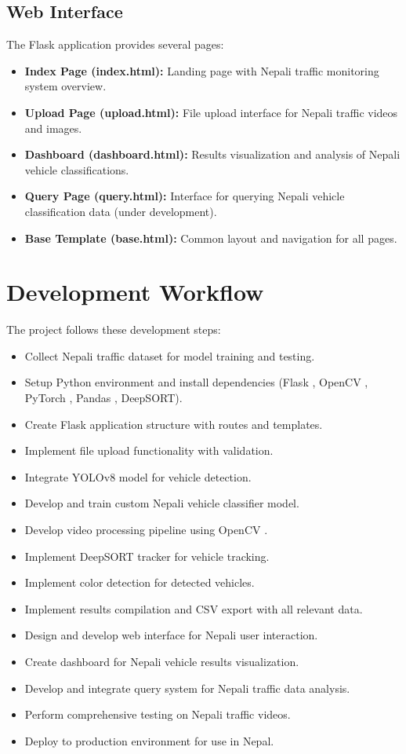 \documentclass[12pt,a4paper]{report}
\begin{document}
\subsection{Web Interface}
The Flask application provides several pages:
\begin{itemize}
    \item \textbf{Index Page (index.html):} Landing page with Nepali traffic monitoring system overview.
    \item \textbf{Upload Page (upload.html):} File upload interface for Nepali traffic videos and images.
    \item \textbf{Dashboard (dashboard.html):} Results visualization and analysis of Nepali vehicle classifications.
    \item \textbf{Query Page (query.html):} Interface for querying Nepali vehicle classification data (under development).
    \item \textbf{Base Template (base.html):} Common layout and navigation for all pages.
\end{itemize}

\section{Development Workflow}
The project follows these development steps:
\begin{itemize}
    \item Collect Nepali traffic dataset for model training and testing.
    \item Setup Python environment and install dependencies (Flask \cite{flask2023}, OpenCV \cite{opencv2000the}, PyTorch \cite{pytorch2019automatic}, Pandas \cite{mckinney2010data}, DeepSORT).
    \item Create Flask application structure with routes and templates.
    \item Implement file upload functionality with validation.
    \item Integrate YOLOv8 model \cite{ultralytics2023yolov8} for vehicle detection.
    \item Develop and train custom Nepali vehicle classifier model.
    \item Develop video processing pipeline using OpenCV \cite{opencv2000the}.
    \item Implement DeepSORT tracker \cite{bewley2016deepsort} for vehicle tracking.
    \item Implement color detection for detected vehicles.
    \item Implement results compilation and CSV export with all relevant data.
    \item Design and develop web interface for Nepali user interaction.
    \item Create dashboard for Nepali vehicle results visualization.
    \item Develop and integrate query system for Nepali traffic data analysis.
    \item Perform comprehensive testing on Nepali traffic videos.
    \item Deploy to production environment for use in Nepal.
\end{itemize}
\end{document}
